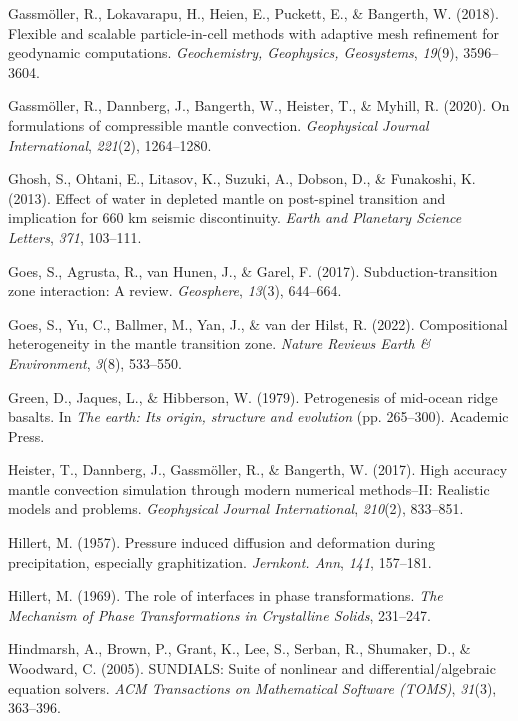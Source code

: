 \documentclass[draft,linenumbers]{agujournal2019}
\newlength{\cslhangindent}
\newenvironment{CSLReferences}[2]
 {\begin{list}{}{
  \setlength{\itemindent}{0pt}
  \setlength{\leftmargin}{0pt}
  \setlength{\parsep}{0pt}
  \ifodd #1
   \setlength{\leftmargin}{\cslhangindent}
   \setlength{\itemindent}{-\cslhangindent}
  \fi
  \setlength{\itemsep}{#2\baselineskip}
  }
  \item\relax}
 {\end{list}}
\begin{document}
\begin{CSLReferences}{1}{0}
Gassmöller, R., Lokavarapu, H., Heien, E., Puckett, E., \& Bangerth, W.
(2018). Flexible and scalable particle-in-cell methods with adaptive
mesh refinement for geodynamic computations. \emph{Geochemistry,
Geophysics, Geosystems}, \emph{19}(9), 3596--3604.

Gassmöller, R., Dannberg, J., Bangerth, W., Heister, T., \& Myhill, R.
(2020). On formulations of compressible mantle convection.
\emph{Geophysical Journal International}, \emph{221}(2), 1264--1280.

Ghosh, S., Ohtani, E., Litasov, K., Suzuki, A., Dobson, D., \&
Funakoshi, K. (2013). Effect of water in depleted mantle on post-spinel
transition and implication for 660 km seismic discontinuity. \emph{Earth
and Planetary Science Letters}, \emph{371}, 103--111.

{Goes, S., Agrusta, R., van Hunen, J., \& Garel, F.} (2017).
Subduction-transition zone interaction: A review. \emph{Geosphere},
\emph{13}(3), 644--664.

{Goes, S., Yu, C., Ballmer, M., Yan, J., \& van der Hilst, R.} (2022).
Compositional heterogeneity in the mantle transition zone. \emph{Nature
Reviews Earth \& Environment}, \emph{3}(8), 533--550.

Green, D., Jaques, L., \& Hibberson, W. (1979). Petrogenesis of
mid-ocean ridge basalts. In \emph{The earth: Its origin, structure and
evolution} (pp. 265--300). Academic Press.

Heister, T., Dannberg, J., Gassmöller, R., \& Bangerth, W. (2017). High
accuracy mantle convection simulation through modern numerical
methods--{II}: Realistic models and problems. \emph{Geophysical Journal
International}, \emph{210}(2), 833--851.

Hillert, M. (1957). Pressure induced diffusion and deformation during
precipitation, especially graphitization. \emph{Jernkont. Ann},
\emph{141}, 157--181.

Hillert, M. (1969). The role of interfaces in phase transformations.
\emph{The Mechanism of Phase Transformations in Crystalline Solids},
231--247.

Hindmarsh, A., Brown, P., Grant, K., Lee, S., Serban, R., Shumaker, D.,
\& Woodward, C. (2005). {SUNDIALS}: Suite of nonlinear and
differential/algebraic equation solvers. \emph{ACM Transactions on
Mathematical Software (TOMS)}, \emph{31}(3), 363--396.


\end{CSLReferences}
\end{document}
